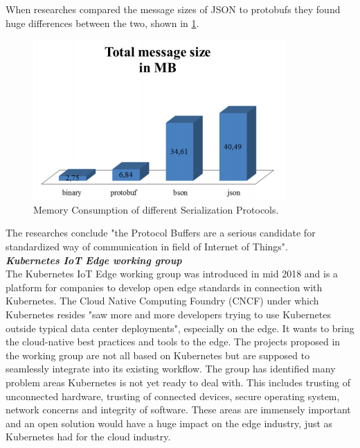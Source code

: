 When researches compared the message sizes of JSON to protobufs they found huge differences between the two, shown in \cref{fig:jsonVsProtobufs}.
\begin{figure}[H]
    \centering
    \includegraphics[scale=0.6]{figures/jsonVsProtobufs.png}
    \caption{Memory Consumption of different Serialization Protocols\cite{jsonVsProtobufs}.}
    \label{fig:jsonVsProtobufs}
\end{figure}
The researches conclude "the Protocol Buffers are a serious candidate for standardized way of communication in field of Internet of Things"\cite{jsonVsProtobufs}.\\[5mm]
{{\textbf{\textit{Kubernetes IoT Edge working group}}}}\\
The Kubernetes IoT Edge working group\cite{IntroducingDejanBosanac:KubernetesIoTEdgeWorkingGroup} was introduced in mid 2018 and is a platform for companies to develop open edge standards in connection with Kubernetes. The Cloud Native Computing Foundry (CNCF) under which Kubernetes resides "saw more and more developers trying to use Kubernetes outside typical data center deployments"\cite{IntroducingDejanBosanac:KubernetesIoTEdgeWorkingGroup}, especially on the edge. It wants to bring the cloud-native best practices and tools to the edge. The projects proposed in the working group are not all based on Kubernetes but are supposed to seamlessly integrate into its existing workflow. The group has identified many problem areas Kubernetes is not yet ready to deal with. This includes trusting of unconnected hardware, trusting of connected devices, secure operating system, network concerns and integrity of software. These areas are immensely important and an open solution would have a huge impact on the edge industry, just as Kubernetes had for the cloud industry.



